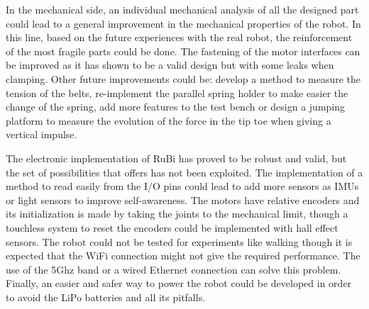 In the mechanical side, an individual mechanical analysis of all the designed part could lead to a general improvement in the mechanical properties of the robot.
In this line, based on the future experiences with the real robot, the reinforcement of the most fragile parts could be done. 
The fastening of the motor interfaces can be improved as it has shown to be a valid design but with some leaks when clamping.
Other future improvements could be: develop a method to measure the tension of the belts, re-implement the parallel spring holder to make easier the change of the spring, add more features to the test bench or design a jumping platform to measure the evolution of the force in the tip toe when giving a vertical impulse.

The electronic implementation of RuBi has proved to be robust and valid, but the set of possibilities that offers has not been exploited.
The implementation of a method to read easily from the I/O pins could lead to add more sensors as IMUs or light sensors to improve self-awareness.
The motors have relative encoders and its initialization is made by taking the joints to the mechanical limit, though a touchless system to reset the encoders could be implemented with hall effect sensors.
The robot could not be tested for experiments like walking though it is expected that the WiFi connection might not give the required performance. 
The use of the 5Ghz band or a wired Ethernet connection can solve this problem.
Finally, an easier and safer way to power the robot could be developed in order to avoid the LiPo batteries and all its pitfalls.


